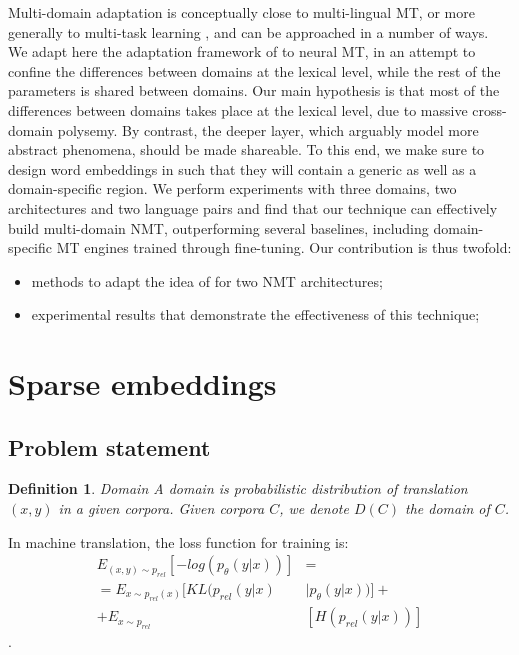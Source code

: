 \documentclass[11pt,a4paper]{article}
\newtheorem{definition}{Definition}[section]
\newcommand{\fyTodo}[1]{\Todo[FY:]{\textcolor{orange}{#1}}}
\newcommand{\fyDone}[1]{\done[FY]\Todo[FY:]{\textcolor{orange}{#1}}}
\begin{document}
Multi-domain adaptation is conceptually close to multi-lingual MT\cite{}, or more generally to multi-task learning \cite{}, and can be approached in a number of ways. We adapt here the adaptation framework of \cite{Daume07frustratingly} to neural MT, in an attempt to confine the differences between domains at the lexical level, while the rest of the parameters is shared between domains. Our main hypothesis is that most of the differences between domains takes place at the lexical level, due to massive cross-domain polysemy. By contrast, the deeper layer, which arguably model more abstract phenomena, should be made shareable.
To this end, we make sure to design word embeddings in such that they will contain a generic as well as a domain-specific region. We perform experiments with three domains, two architectures and two language pairs and find that our technique can effectively build multi-domain NMT, outperforming several baselines, including domain-specific MT engines trained through fine-tuning. Our contribution is thus twofold:
\begin{itemize}
\item methods to adapt the idea of \cite{Daume07frustratingly} for two NMT architectures;
\item experimental results that demonstrate the effectiveness of this technique;
\end{itemize}
\fyTodo{can we train in random order ? can we get away with catastrophic forgetting ?}
\fyTodo{how to analyze the embeddings ? how can we test or claim ?}

\section{Sparse embeddings \label{sec:sparse_embeddings}}
\fyDone{Use meaningful titles throughout}

\subsection{Problem statement}
\fyTodo{Use math for notation, label equations and such}
\begin{definition}{Domain}
\label{def:domain}
A domain is probabilistic distribution of translation $(x,y)$ in a given corpora. Given corpora $C$, we denote $D(C)$ the domain of $C$.
\end{definition}
\fyTodo{We need more: the source, the target, etc}
In machine translation, the loss function for training is:
\begin{equation}
\begin{split}
E_{(x,y) \sim p_{rel}}[-log(p_{\theta}(y|x))] &= \\
= E_{x \sim p_{rel}(x)}[KL(p_{rel}(y|x) & \mid p_{\theta}(y|x))] + \\
+ E_{x \sim p_{rel}} &[H(p_{rel}(y|x))]
\end{split}
\end{equation}.
\end{document}
